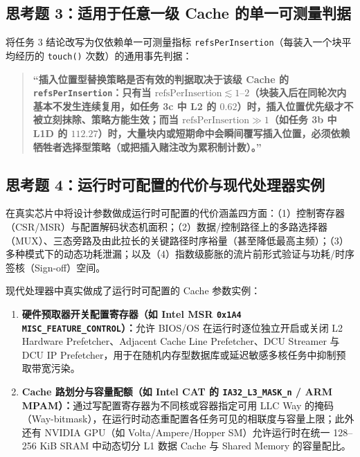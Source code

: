 \documentclass[12pt,a4paper,fontset=mac]{ctexart}
\begin{document}
\subsection*{思考题 3：适用于任意一级 Cache 的单一可测量判据}
将任务 3 结论改写为仅依赖单一可测量指标 \texttt{refsPerInsertion}（每装入一个块平均经历的 \texttt{touch()} 次数）的通用事先判据：
\begin{quote}
\textbf{“插入位置型替换策略是否有效的判据取决于该级 Cache 的 \texttt{refsPerInsertion}：只有当 $\text{refsPerInsertion} \lesssim 1\text{--}2$（块装入后在同轮次内基本不发生连续复用，如任务 3c 中 L2 的 $0.62$）时，插入位置优先级才不被立刻抹除、策略方能生效；而当 $\text{refsPerInsertion} \gg 1$（如任务 3b 中 L1D 的 $112.27$）时，大量块内或短期命中会瞬间覆写插入位置，必须依赖牺牲者选择型策略（或把插入赌注改为累积制计数）。”}
\end{quote}

\subsection*{思考题 4：运行时可配置的代价与现代处理器实例}
在真实芯片中将设计参数做成运行时可配置的代价涵盖四方面：（1）控制寄存器（CSR/MSR）与配置解码状态机面积；（2）数据/控制路径上的多路选择器（MUX）、三态旁路及由此拉长的关键路径时序裕量（甚至降低最高主频）；（3）多种模式下的动态功耗泄漏；以及（4）指数级膨胀的流片前形式验证与功耗/时序签核（Sign-off）空间。

现代处理器中真实做成了运行时可配置的 Cache 参数实例：
\begin{enumerate}
  \item \textbf{硬件预取器开关配置寄存器（如 Intel MSR \texttt{0x1A4} \texttt{MISC\_FEATURE\_CONTROL}）：}允许 BIOS/OS 在运行时逐位独立开启或关闭 L2 Hardware Prefetcher、Adjacent Cache Line Prefetcher、DCU Streamer 与 DCU IP Prefetcher，用于在随机内存型数据库或延迟敏感多核任务中抑制预取带宽污染。
  \item \textbf{Cache 路划分与容量配额（如 Intel CAT 的 \texttt{IA32\_L3\_MASK\_n} / ARM MPAM）：}通过写配置寄存器为不同核或容器指定可用 LLC Way 的掩码（Way-bitmask），在运行时动态重配置各任务可见的相联度与容量上限；此外还有 NVIDIA GPU（如 Volta/Ampere/Hopper SM）允许运行时在统一 128--256 KiB SRAM 中动态切分 L1 数据 Cache 与 Shared Memory 的容量配比。
\end{enumerate}
\end{document}
